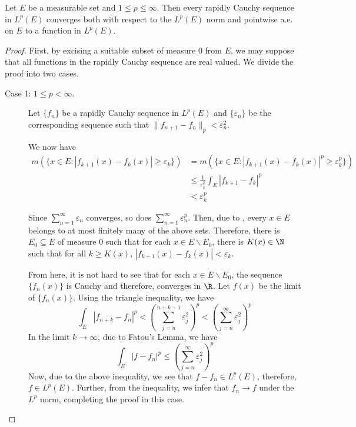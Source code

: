 \begin{theorem}
    Let $E$ be a measurable set and $1\le p\le\infty$. Then every rapidly Cauchy sequence in $L^p(E)$ converges both with respect to the $L^p(E)$ norm and pointwise a.e. on $E$ to a function in $L^p(E)$.
\end{theorem}
\begin{proof}
First, by excising a suitable subset of measure $0$ from $E$, we may suppose that all functions in the rapidly Cauchy sequence are real valued. We divide the proof into two cases.
\begin{description}
\item[Case 1: $1\le p < \infty$.] Let $\{f_n\}$ be a rapidly Cauchy sequence in $L^p(E)$ and $\{\varepsilon_n\}$ be the corresponding sequence such that $\|f_{n + 1} - f_n\|_p < \varepsilon_n^2$.

We now have 
\begin{align*}
    m\left(\{x\in E: |f_{k + 1}(x) - f_k(x)|\ge\varepsilon_k\}\right) &= m\left(\{x\in E: |f_{k + 1}(x) - f_k(x)|^p\ge\varepsilon_k^p\}\right)\\
    &\le\frac{1}{\varepsilon_k^p}\int_E|f_{k + 1} - f_k|^p\\
    & < \varepsilon_k^p
\end{align*}

Since $\sum_{n = 1}^\infty\varepsilon_n$ converges, so does $\sum_{n = 1}^\infty\varepsilon_n^p$. Then, due to , every $x\in E$ belongs to at most finitely many of the above sets. Therefore, there is $E_0\subseteq E$ of measure $0$ such that for each $x\in E\backslash E_0$, there is $K(x)\in\N$ such that for all $k\ge K(x)$, $|f_{k + 1}(x) - f_k(x)| < \varepsilon_k$. 

From here, it is not hard to see that for each $x\in E\backslash E_0$, the sequence $\{f_n(x)\}$ is Cauchy and therefore, converges in $\R$. Let $f(x)$ be the limit of $\{f_n(x)\}$. Using the triangle inequality, we have 
\begin{equation*}
    \int_E|f_{n + k} - f_n|^p < \left(\sum_{j = n}^{n + k - 1}\varepsilon_j^2\right)^p < \left(\sum_{j = n}^\infty\varepsilon_j^2\right)^p
\end{equation*}
In the limit $k\to\infty$, due to Fatou's Lemma, we have 
\begin{equation*}
    \int_E|f - f_n|^p\le\left(\sum_{j = n}^\infty\varepsilon_j^2\right)^p
\end{equation*}
Now, due to the above inequality, we see that $f - f_n\in L^p(E)$, therefore, $f\in L^p(E)$. Further, from the inequality, we infer that $f_n\to f$ under the $L^p$ norm, completing the proof in this case.
\end{description}
\end{proof}

